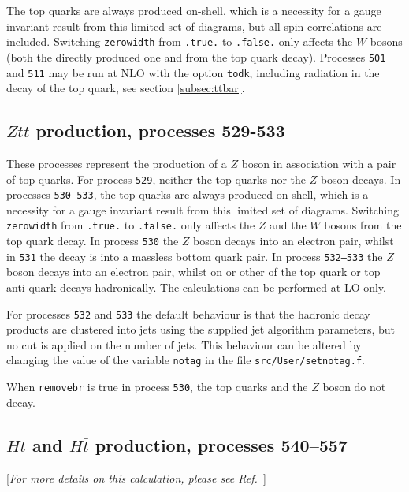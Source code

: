 The top quarks are always
produced on-shell, which is a necessity for a gauge invariant result
from this limited set of diagrams, but all spin correlations are included.
Switching {\tt zerowidth} from {\tt .true.} to {\tt .false.} only affects
the $W$ bosons (both the directly produced one and from the top quark decay).
Processes {\tt 501} and {\tt 511} may be run at NLO with the option {\tt todk},
including radiation in the decay of the top quark, see section \ref{subsec:ttbar}.






\subsection{$Zt{\bar t}$ production, processes 529-533}
\label{subsec:ztt}

These processes represent the production of a $Z$ boson in association
with a pair of top quarks.
For process {\tt 529}, neither the top quarks nor the $Z$-boson
decays. 
In processes {\tt 530-533}, the top quarks are always
produced on-shell, which is a necessity for a gauge invariant result
from this limited set of diagrams.
Switching {\tt zerowidth} from {\tt .true.} to {\tt .false.} only affects
the $Z$ and the $W$ bosons from the top quark decay.
In process {\tt 530} the $Z$ boson decays into an electron pair, whilst
in {\tt 531} the decay is into a massless bottom quark pair.
In process {\tt 532--533} the $Z$ boson decays into an electron pair, whilst
on or other of the top quark or top anti-quark decays hadronically.
The calculations can be performed at LO only.

For processes {\tt 532} and {\tt 533} the default behaviour is that the hadronic decay products
are clustered into jets using the supplied jet
algorithm parameters, but no cut is applied on the number of jets.
This behaviour can be altered by changing the value of the
variable {\tt notag} in the file {\tt src/User/setnotag.f}.

When {\tt removebr} is true in process {\tt 530}, the top quarks and the $Z$ boson do not decay.

\subsection{$Ht$ and $H\bar{t}$ production, processes 540--557}

\begin{center}
[{\it For more details on this calculation, please see Ref.~\cite{Campbell:2013yla}}]
\end{center}

